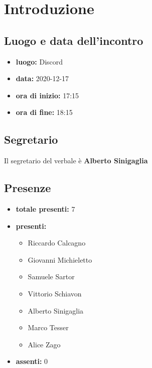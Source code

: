 \section{Introduzione}

\subsection{Luogo e data dell'incontro}
	\begin{itemize}
		\item \textbf{luogo:} Discord
		\item \textbf{data:} 2020-12-17
		\item \textbf{ora di inizio:} 17:15
		\item \textbf{ora di fine:} 18:15
	\end{itemize}

\subsection{Segretario}
Il segretario del verbale è \textbf{Alberto Sinigaglia}

\subsection{Presenze}
	\begin{itemize}
		\item \textbf{totale presenti:} 7
		\item \textbf{presenti: }
			\begin{itemize}		
				\item Riccardo Calcagno
				\item Giovanni Michieletto
				\item Samuele Sartor
				\item Vittorio Schiavon
				\item Alberto Sinigaglia
				\item Marco Tesser
				\item Alice Zago
			\end{itemize}
		\item \textbf{assenti: } 0
	\end{itemize}


\newpage
